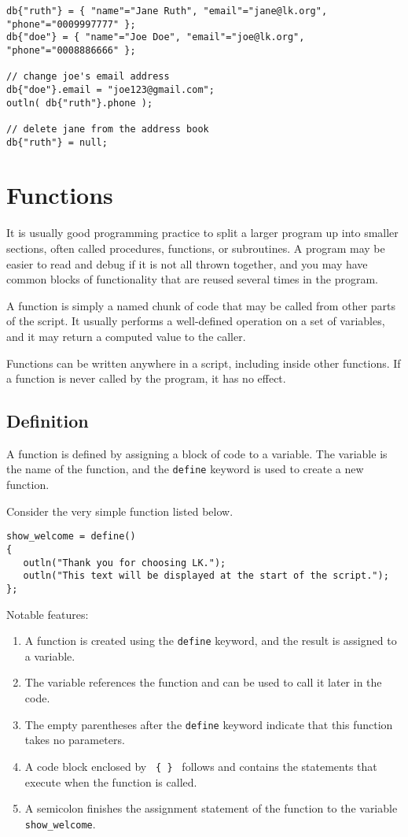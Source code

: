 \documentclass{article}
\begin{document}
\begin{verbatim}
db{"ruth"} = { "name"="Jane Ruth", "email"="jane@lk.org", "phone"="0009997777" };
db{"doe"} = { "name"="Joe Doe", "email"="joe@lk.org", "phone"="0008886666" };

// change joe's email address
db{"doe"}.email = "joe123@gmail.com";
outln( db{"ruth"}.phone );

// delete jane from the address book
db{"ruth"} = null;

\end{verbatim}

\section{Functions}

It is usually good programming practice to split a larger program up into smaller sections, often called procedures, functions, or subroutines.  A program may be easier to read and debug if it is not all thrown together, and you may have common blocks of functionality that are reused several times in the program.

A function is simply a named chunk of code that may be called from other parts of the script.  It usually performs a well-defined operation on a set of variables, and it may return a computed value to the caller.

Functions can be written anywhere in a script, including inside other functions.  If a function is never called by the program, it has no effect.

\subsection{Definition}

A function is defined by assigning a block of code to a variable.  The variable is the name of the function, and the \texttt{define} keyword is used to create a new function.

Consider the very simple function listed below.

\begin{verbatim}
show_welcome = define()
{
   outln("Thank you for choosing LK.");
   outln("This text will be displayed at the start of the script.");
};
\end{verbatim}

Notable features:
\begin{enumerate}
\item A function is created using the \texttt{define} keyword, and the result is assigned to a variable.
\item The variable references the function and can be used to call it later in the code.
\item The empty parentheses after the \texttt{define} keyword indicate that this function takes no parameters.
\item A code block enclosed by \texttt{ \{ \} } follows and contains the statements that execute when the function is called.
\item A semicolon finishes the assignment statement of the function to the variable \texttt{show\_welcome}.
\end{enumerate}
\end{document}
